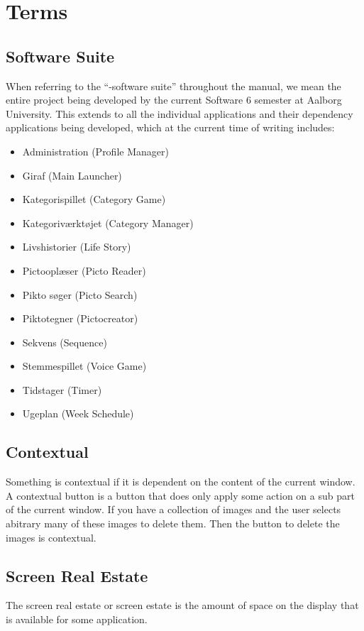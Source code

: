 
\chapter{Terms}

\section{\giraf Software Suite}
\noindent When referring to the ``\giraf-software suite'' throughout the manual, we mean the entire \giraf project being developed by the current Software 6 semester at Aalborg University. This extends to all the individual applications and their dependency applications being developed, which at the current time of writing includes: 

\begin{itemize}
    \item Administration (Profile Manager)
    \item Giraf (Main Launcher)
    \item Kategorispillet (Category Game)
    \item Kategoriværktøjet (Category Manager)
    \item Livshistorier (Life Story)
    \item Pictooplæser (Picto Reader)
    \item Pikto søger (Picto Search)
    \item Piktotegner (Pictocreator)
    \item Sekvens (Sequence)
    \item Stemmespillet (Voice Game)
    \item Tidstager (Timer)
    \item Ugeplan (Week Schedule)
\end{itemize}

\section{Contextual}
Something is contextual if it is dependent on the content of the current window. A contextual button is a button that does only apply some action on a sub part of the current window. If you have a collection of images and the user selects abitrary many of these images to delete them. Then the button to delete the images is contextual.

\section{Screen Real Estate}
The screen real estate or screen estate is the amount of space on the display that is available for some application.